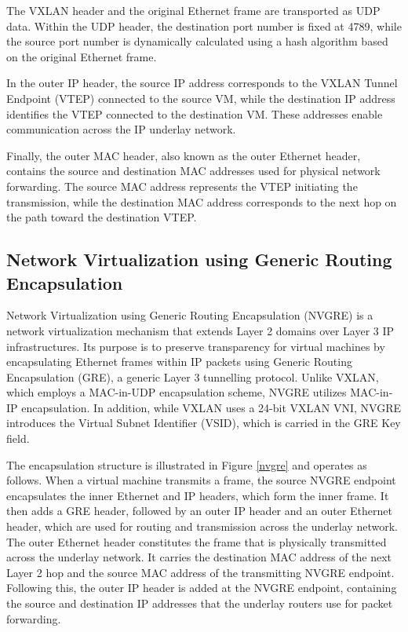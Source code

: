 The VXLAN header and the original Ethernet frame are transported as UDP data. Within the UDP header, the destination port number is fixed at 4789, while the source port number is dynamically calculated using a hash algorithm based on the original Ethernet frame. 

In the outer IP header, the source IP address corresponds to the VXLAN Tunnel Endpoint (VTEP) connected to the source VM, while the destination IP address identifies the VTEP connected to the destination VM. These addresses enable communication across the IP underlay network.

Finally, the outer MAC header, also known as the outer Ethernet header, contains the source and destination MAC addresses used for physical network forwarding. The source MAC address represents the VTEP initiating the transmission, while the destination MAC address corresponds to the next hop on the path toward the destination VTEP.

\subsection{Network Virtualization using Generic Routing Encapsulation}

Network Virtualization using Generic Routing Encapsulation (NVGRE) is a network virtualization mechanism that extends Layer 2 domains over Layer 3 IP infrastructures. Its purpose is to preserve transparency for virtual machines by encapsulating Ethernet frames within IP packets using Generic Routing Encapsulation (GRE), a generic Layer 3 tunnelling protocol. Unlike VXLAN, which employs a MAC-in-UDP encapsulation scheme, NVGRE utilizes MAC-in-IP encapsulation. In addition, while VXLAN uses a 24-bit VXLAN VNI, NVGRE introduces the Virtual Subnet Identifier (VSID), which is carried in the GRE Key field.

The encapsulation structure is illustrated in Figure \ref{nvgre} and operates as follows. When a virtual machine transmits a frame, the source NVGRE endpoint encapsulates the inner Ethernet and IP headers, which form the inner frame. It then adds a GRE header, followed by an outer IP header and an outer Ethernet header, which are used for routing and transmission across the underlay network. The outer Ethernet header constitutes the frame that is physically transmitted across the underlay network. It carries the destination MAC address of the next Layer 2 hop and the source MAC address of the transmitting NVGRE endpoint. Following this, the outer IP header is added at the NVGRE endpoint, containing the source and destination IP addresses that the underlay routers use for packet forwarding.

